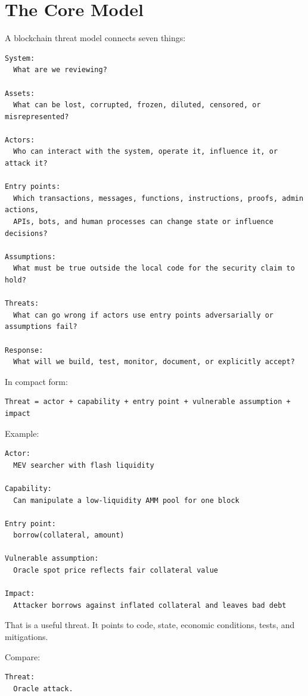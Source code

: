 \section{The Core Model}

A blockchain threat model connects seven things:

\begin{lstlisting}
System:
  What are we reviewing?

Assets:
  What can be lost, corrupted, frozen, diluted, censored, or misrepresented?

Actors:
  Who can interact with the system, operate it, influence it, or attack it?

Entry points:
  Which transactions, messages, functions, instructions, proofs, admin actions,
  APIs, bots, and human processes can change state or influence decisions?

Assumptions:
  What must be true outside the local code for the security claim to hold?

Threats:
  What can go wrong if actors use entry points adversarially or assumptions fail?

Response:
  What will we build, test, monitor, document, or explicitly accept?
\end{lstlisting}

In compact form:

\begin{lstlisting}
Threat = actor + capability + entry point + vulnerable assumption + impact
\end{lstlisting}

Example:

\begin{lstlisting}
Actor:
  MEV searcher with flash liquidity

Capability:
  Can manipulate a low-liquidity AMM pool for one block

Entry point:
  borrow(collateral, amount)

Vulnerable assumption:
  Oracle spot price reflects fair collateral value

Impact:
  Attacker borrows against inflated collateral and leaves bad debt
\end{lstlisting}

That is a useful threat. It points to code, state, economic conditions,
tests, and mitigations.

Compare:

\begin{lstlisting}
Threat:
  Oracle attack.
\end{lstlisting}

